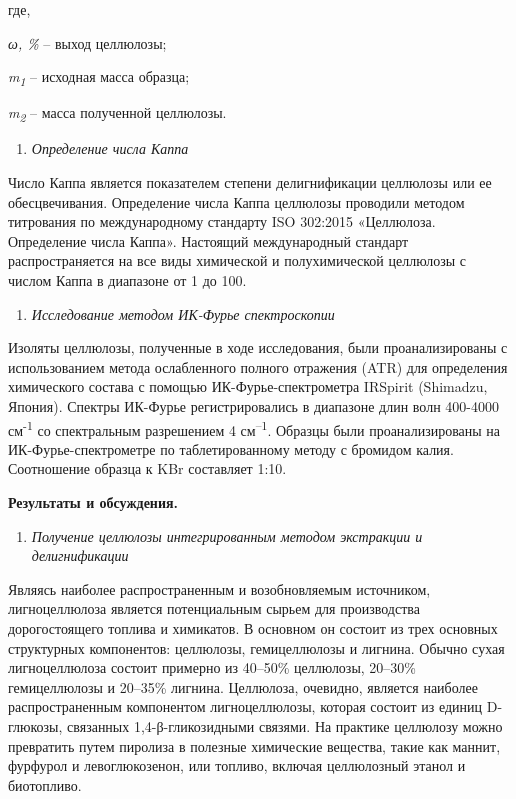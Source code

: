 где,

\emph{ω, \%} -- выход целлюлозы;

\emph{m\textsubscript{1}} -- исходная масса образца;

\emph{m\textsubscript{2}} -- масса полученной целлюлозы.

\begin{enumerate}
\def\labelenumi{\arabic{enumi}.}
\setcounter{enumi}{4}
\item
  \emph{Определение числа Каппа}
\end{enumerate}

Число Каппа является показателем степени делигнификации целлюлозы или ее
обесцвечивания. Определение числа Каппа целлюлозы проводили методом
титрования по международному стандарту ISO 302:2015 «Целлюлоза.
Определение числа Каппа». Настоящий международный стандарт
распространяется на все виды химической и полухимической целлюлозы с
числом Каппа в диапазоне от 1 до 100.

\begin{enumerate}
\def\labelenumi{\arabic{enumi}.}
\setcounter{enumi}{5}
\item
  \emph{Исследование методом ИК-Фурье спектроскопии}
\end{enumerate}

Изоляты целлюлозы, полученные в ходе исследования, были проанализированы
с использованием метода ослабленного полного отражения (ATR) для
определения химического состава с помощью ИК-Фурье-спектрометра IRSpirit
(Shimadzu, Япония). Спектры ИК-Фурье регистрировались в диапазоне длин
волн 400-4000 см\textsuperscript{-1} со спектральным разрешением 4
см\textsuperscript{--1}. Образцы были проанализированы на
ИК-Фурье-спектрометре по таблетированному методу с бромидом калия.
Соотношение образца к KBr составляет 1:10.

{\bfseries Результаты и обсуждения.}

\begin{enumerate}
\def\labelenumi{\arabic{enumi}.}
\item
  \emph{Получение целлюлозы интегрированным методом экстракции и
  делигнификации}
\end{enumerate}

Являясь наиболее распространенным и возобновляемым источником,
лигноцеллюлоза является потенциальным сырьем для производства
дорогостоящего топлива и химикатов. В основном он состоит из трех
основных структурных компонентов: целлюлозы, гемицеллюлозы и лигнина.
Обычно сухая лигноцеллюлоза состоит примерно из 40--50\% целлюлозы,
20--30\% гемицеллюлозы и 20--35\% лигнина. Целлюлоза, очевидно, является
наиболее распространенным компонентом лигноцеллюлозы, которая состоит из
единиц D-глюкозы, связанных 1,4-β-гликозидными связями. На практике
целлюлозу можно превратить путем пиролиза в полезные химические
вещества, такие как маннит, фурфурол и левоглюкозенон, или топливо,
включая целлюлозный этанол и биотопливо.

